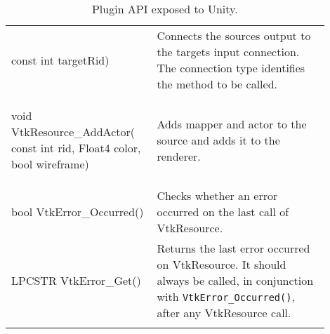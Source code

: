 \begin{appendices}
\begin{landscape}
\begin{longtable}[c]{
			>{\raggedright\arraybackslash}p{0.4\linewidth}
			>{\raggedright\arraybackslash}p{0.5\linewidth}
		}
\begin{codify}
		const int targetRid)
	\end{codify} &
	Connects the sources output to the targets input connection. The connection type identifies the method to be called.
	\\
	\begin{codify}
	void VtkResource_AddActor(
		const int rid,
		Float4 color,
		bool wireframe)
	\end{codify} &
	Adds mapper and actor to the source and adds it to the renderer.
	\\
	\begin{codify}
	bool VtkError_Occurred()
	\end{codify} &
	Checks whether an error occurred on the last call of VtkResource.
	\\
	\begin{codify}
	LPCSTR VtkError_Get()
	\end{codify} &
	Returns the last error occurred on VtkResource. It should always be called, in conjunction with \verb|VtkError_Occurred()|, after any VtkResource call.
	\\
	\caption{Plugin API exposed to Unity.}
	\label{tab:plugin-api}\\
	\end{longtable}
\end{landscape}


\end{appendices}
